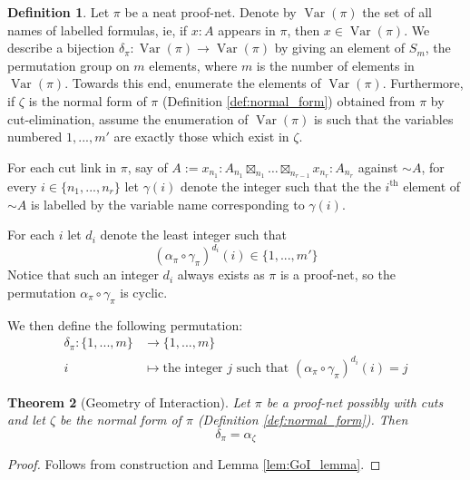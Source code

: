 \documentclass[12pt]{article}
\theoremstyle{plain}
\newtheorem{thm}{Theorem}[subsection] %
\theoremstyle{definition}
\newtheorem{defn}[thm]{Definition} %
\newcommand{\lto}{\longrightarrow}
\newcommand{\negation}{\sim}
\begin{document}
\begin{defn}\label{def:GoI_permutation}
Let $\pi$ be a neat proof-net. Denote by $\operatorname{Var}(\pi)$ the set of all names of labelled formulas, ie, if $x:A$ appears in $\pi$, then $x \in \operatorname{Var}(\pi)$. We describe a bijection $\delta_\pi: \operatorname{Var}(\pi) \lto \operatorname{Var}(\pi)$ by giving an element of $S_m$, the permutation group on $m$ elements, where $m$ is the number of elements in $\operatorname{Var}(\pi)$. Towards this end, enumerate the elements of $\operatorname{Var}(\pi)$. Furthermore, if $\zeta$ is the normal form of $\pi$ (Definition \ref{def:normal_form}) obtained from $\pi$ by cut-elimination, assume the enumeration of $\operatorname{Var}(\pi)$ is such that the variables numbered $1,...,m'$ are exactly those which exist in $\zeta$.

For each cut link in $\pi$, say of $A := x_{n_1}:A_{n_1} \boxtimes_{n_1}\hdots \boxtimes_{n_{r-1}} x_{n_r}: A_{n_r}$ against $\negation A$, for every $i \in \lbrace n_1,...,n_r\rbrace$ let $\gamma(i)$ denote the integer such that the the $i^{\text{th}}$ element of $\negation A$ is labelled by the variable name corresponding to $\gamma(i)$.

For each $i$ let $d_i$ denote the least integer such that 
\begin{equation}
(\alpha_{\pi} \circ \gamma_{\pi})^{d_i}(i) \in \lbrace 1,...,m'\rbrace    
\end{equation}
Notice that such an integer $d_i$ always exists as $\pi$ is a proof-net, so the permutation $\alpha_{\pi} \circ \gamma_{\pi}$ is cyclic.

We then define the following permutation:
\begin{align*}
    \delta_{\pi}: \lbrace 1,...,m\rbrace &\lto \lbrace 1,...,m\rbrace\\
    i &\longmapsto \text{the integer }j\text{ such that } (\alpha_{\pi} \circ \gamma_{\pi})^{d_i}(i) = j
\end{align*}
\end{defn}
\begin{thm}[Geometry of Interaction]
Let $\pi$ be a proof-net possibly with cuts and let $\zeta$ be the normal form of $\pi$ (Definition \ref{def:normal_form}). Then
\begin{equation}
    \delta_\pi = \alpha_{\zeta}
\end{equation}
\end{thm}
\begin{proof}
Follows from construction and Lemma \ref{lem:GoI_lemma}.
\end{proof}
\end{document}
